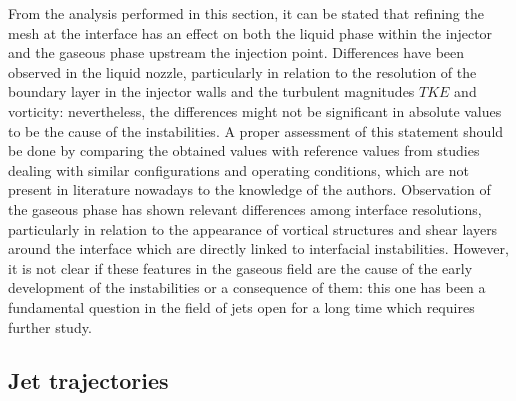 From the analysis performed in this section, it can be stated that refining the mesh at the interface has an effect on both the liquid phase within the injector and the gaseous phase upstream the injection point. Differences have been observed in the liquid nozzle, particularly in relation to the resolution of the boundary layer in the injector walls and the turbulent magnitudes $TKE$ and vorticity: nevertheless, the differences might not be significant in absolute values to be the cause of the instabilities. A proper assessment of this statement should be done by comparing the obtained values with reference values from studies dealing with similar configurations and operating conditions, which are not present in literature nowadays to the knowledge of the authors. Observation of the gaseous phase has shown relevant differences among interface resolutions, particularly in relation to the appearance of vortical structures and shear layers around the interface which are directly linked to interfacial instabilities. However, it is not clear if these features in the gaseous field are the cause of the early development of the instabilities or a consequence of them: this one has been a fundamental question in the field of jets open for a long time  which requires further study. %









	\vspace*{-0.1in}

\subsection{Jet trajectories}
\label{subsec:ch5_jet_trajectories_results}

